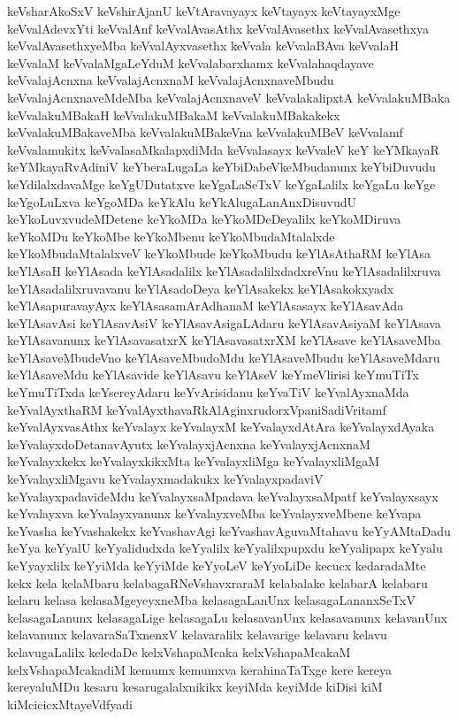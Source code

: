 {keVsharAkoSxV
keVshirAjanU
keVtAravayayx
keVtayayx
keVtayayxMge
keVvalAdevxYti
keVvalAnf
keVvalAvasAthx
keVvalAvasethx
keVvalAvasethxya
keVvalAvasethxyeMba
keVvalAyxvasethx
keVvala
keVvalaBAva
keVvalaH
keVvalaM
keVvalaMgaLeYduM
keVvalabarxhamx
keVvalahaqdayave
keVvalajAcnxna
keVvalajAcnxnaM
keVvalajAcnxnaveMbudu
keVvalajAcnxnaveMdeMba
keVvalajAcnxnaveV
keVvalakalipxtA
keVvalakuMBaka
keVvalakuMBakaH
keVvalakuMBakaM
keVvalakuMBakakekx
keVvalakuMBakaveMba
keVvalakuMBakeVna
keVvalakuMBeV
keVvalamf
keVvalamukitx
keVvalasaMkalapxdiMda
keVvalasayx
keVvaleV
keY
keYMkayaR
keYMkayaRvAdiniV
keYberaLugaLa
keYbiDabeVkeMbudanunx
keYbiDuvudu
keYdilalxdavaMge
keYgUDutatxve
keYgaLaSeTxV
keYgaLalilx
keYgaLu
keYge
keYgoLuLxva
keYgoMDa
keYkAlu
keYkAlugaLanAnxDisuvudU
keYkoLuvxvudeMDetene
keYkoMDa
keYkoMDeDeyalilx
keYkoMDiruva
keYkoMDu
keYkoMbe
keYkoMbenu
keYkoMbudaMtalalxde
keYkoMbudaMtalalxveV
keYkoMbude
keYkoMbudu
keYlAsAthaRM
keYlAsa
keYlAsaH
keYlAsada
keYlAsadalilx
keYlAsadalilxdadxreVnu
keYlAsadalilxruva
keYlAsadalilxruvavanu
keYlAsadoDeya
keYlAsakekx
keYlAsakokxyadx
keYlAsapuravayAyx
keYlAsasamArAdhanaM
keYlAsasayx
keYlAsavAda
keYlAsavAsi
keYlAsavAsiV
keYlAsavAsigaLAdaru
keYlAsavAsiyaM
keYlAsava
keYlAsavanunx
keYlAsavasatxrX
keYlAsavasatxrXM
keYlAsave
keYlAsaveMba
keYlAsaveMbudeVno
keYlAsaveMbudoMdu
keYlAsaveMbudu
keYlAsaveMdaru
keYlAsaveMdu
keYlAsavide
keYlAsavu
keYlAseV
keYmeVlirisi
keYmuTiTx
keYmuTiTxda
keYsereyAdaru
keYvArisidanu
keYvaTiV
keYvalAyxnaMda
keYvalAyxthaRM
keYvalAyxthavaRkAlAginxrudorxVpaniSadiVritamf
keYvalAyxvasAthx
keYvalayx
keYvalayxM
keYvalayxdAtAra
keYvalayxdAyaka
keYvalayxdoDetanavAyutx
keYvalayxjAcnxna
keYvalayxjAcnxnaM
keYvalayxkekx
keYvalayxkikxMta
keYvalayxliMga
keYvalayxliMgaM
keYvalayxliMgavu
keYvalayxmadakukx
keYvalayxpadaviV
keYvalayxpadavideMdu
keYvalayxsaMpadava
keYvalayxsaMpatf
keYvalayxsayx
keYvalayxva
keYvalayxvanunx
keYvalayxveMba
keYvalayxveMbene
keYvapa
keYvasha
keYvashakekx
keYvashavAgi
keYvashavAguvaMtahavu
keYyAMtaDadu
keYya
keYyalU
keYyalidudxda
keYyalilx
keYyalilxpupxdu
keYyalipapx
keYyalu
keYyayxlilx
keYyiMda
keYyiMde
keYyoLeV
keYyoLiDe
kecucx
kedaradaMte
kekx
kela
kelaMbaru
kelabagaRNeVshavxraraM
kelabalake
kelabarA
kelabaru
kelaru
kelasa
kelasaMgeyeyxneMba
kelasagaLanUnx
kelasagaLananxSeTxV
kelasagaLanunx
kelasagaLige
kelasagaLu
kelasavanUnx
kelasavanunx
kelavanUnx
kelavanunx
kelavaraSaTxnenxV
kelavaralilx
kelavarige
kelavaru
kelavu
kelavugaLalilx
keledaDe
kelxVshapaMcaka
kelxVshapaMcakaM
kelxVshapaMcakadiM
kemumx
kemumxva
kerahinaTaTxge
kere
kereya
kereyaluMDu
kesaru
kesarugalalxnikikx
keyiMda
keyiMde
kiDisi
kiM
kiMcicicxMtayeVdfyadi
}
